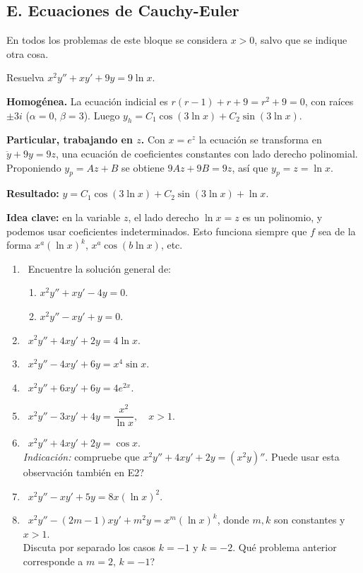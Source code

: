 \subsection*{E. Ecuaciones de Cauchy-Euler}

\noindent En todos los problemas de este bloque se considera $x>0$, salvo que se indique otra cosa.

\begin{example}
    Resuelva $x^2y''+xy'+9y=9\ln x$.

    \textbf{Homog\'enea.} La ecuaci\'on indicial es $r(r-1)+r+9=r^2+9=0$, con ra\'ices $\pm3i$ ($\alpha=0$, $\beta=3$). Luego $y_h=C_1\cos(3\ln x)+C_2\sin(3\ln x)$.

    \textbf{Particular, trabajando en $z$.} Con $x=e^z$ la ecuaci\'on se transforma en $\ddot y+9y=9z$, una ecuaci\'on de coeficientes constantes con lado derecho polinomial. Proponiendo $y_p=Az+B$ se obtiene $9Az+9B=9z$, as\'i que $y_p=z=\ln x$.

    \textbf{Resultado:} $y=C_1\cos(3\ln x)+C_2\sin(3\ln x)+\ln x$.

    \textbf{Idea clave:} en la variable $z$, el lado derecho $\ln x=z$ es un polinomio, y podemos usar coeficientes indeterminados. Esto funciona siempre que $f$ sea de la forma $x^a(\ln x)^k$, $x^a\cos(b\ln x)$, etc.
\end{example}

\begin{enumerate}[label=\textbf{E\arabic*.}, leftmargin=*]
    \item \facil\ Encuentre la soluci\'on general de:
    \begin{enumerate}[label=\alph*)]
        \item $x^2y''+xy'-4y=0$.
        \item $x^2y''-xy'+y=0$.
    \end{enumerate}
    \item \facil\ $x^2y''+4xy'+2y=4\ln x$.
    \item \medio\ $x^2y''-4xy'+6y=x^4\sin x$.
    \item \medio\ $x^2y''+6xy'+6y=4e^{2x}$.
    \item \medio\ $x^2y''-3xy'+4y=\dfrac{x^2}{\ln x},\quad x>1$.
    \item \facil\ $x^2y''+4xy'+2y=\cos x$.\\
    \textit{Indicaci\'on:} compruebe que $x^2y''+4xy'+2y=\left(x^2y\right)''$. \textquestiondown Puede usar esta observaci\'on tambi\'en en E2?
    \item \medio\ $x^2y''-xy'+5y=8x(\ln x)^2$.
    \item \dificil\ $x^2y''-(2m-1)xy'+m^2y=x^m(\ln x)^k$, donde $m,k$ son constantes y $x>1$.\\
    Discuta por separado los casos $k=-1$ y $k=-2$. \textquestiondown Qu\'e problema anterior corresponde a $m=2$, $k=-1$?
\end{enumerate}

